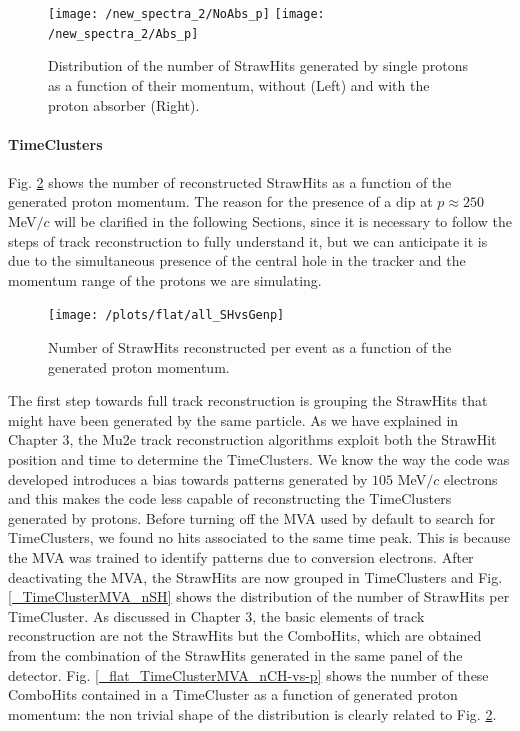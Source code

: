 \documentclass[12pt,a4paper,openright, oneside, titlepage]{book} %
\begin{document}
\begin{figure}[!htb]
\centering
\texttt{[image: /new\_spectra\_2/NoAbs\_p]}\hfill
\texttt{[image: /new\_spectra\_2/Abs\_p]}
\caption[StrawHits with and without proton absorber]
{Distribution of the number of StrawHits generated by single protons as a function of their momentum, without (Left) and with the proton absorber (Right).}
\label{_proton_absorber}
\end{figure}

\paragraph{TimeClusters} 
Fig. \ref{_all_SHvsGenp} shows the number of reconstructed StrawHits as a function of the generated proton momentum.
The reason for the presence of a dip at $p\approx 250$ MeV$/c$ will be clarified in the following Sections, since it is necessary to follow the steps of track reconstruction to fully understand it, but we can anticipate it is due to the simultaneous presence of the central hole in the tracker and the momentum range of the protons we are simulating.

\begin{figure}[!htb]
\centering
\texttt{[image: /plots/flat/all\_SHvsGenp]}
\caption[Number of StrawHits per event]{Number of StrawHits reconstructed per event as a function of the generated proton momentum.}
\label{_all_SHvsGenp}
\end{figure}

\noindent The first step towards full track reconstruction is grouping the StrawHits that might have been generated by the same particle. 
As we have explained in Chapter 3, the Mu2e track reconstruction algorithms exploit both the StrawHit position and time to determine the TimeClusters. 
We know the way the code was developed introduces a bias towards patterns generated by $105$ MeV$/c$ electrons and this makes the code less capable of reconstructing the TimeClusters generated by protons. 
Before turning off the MVA used by default to search for TimeClusters, we found no hits associated to the same time peak. 
This is because the MVA was trained to identify patterns due to conversion electrons. 
After deactivating the MVA, the StrawHits are now grouped in TimeClusters and Fig. \ref{_TimeClusterMVA_nSH} shows the distribution of the number of StrawHits per TimeCluster. 
As discussed in Chapter 3, the basic elements of track reconstruction are not the StrawHits but the ComboHits, which are obtained from the combination of the StrawHits generated in the same panel of the detector. 
Fig. \ref{_flat_TimeClusterMVA_nCH-vs-p} shows the number of these ComboHits contained in a TimeCluster as a function of generated proton momentum: the non trivial shape of the distribution is clearly related to Fig. \ref{_all_SHvsGenp}. 
\end{document}
